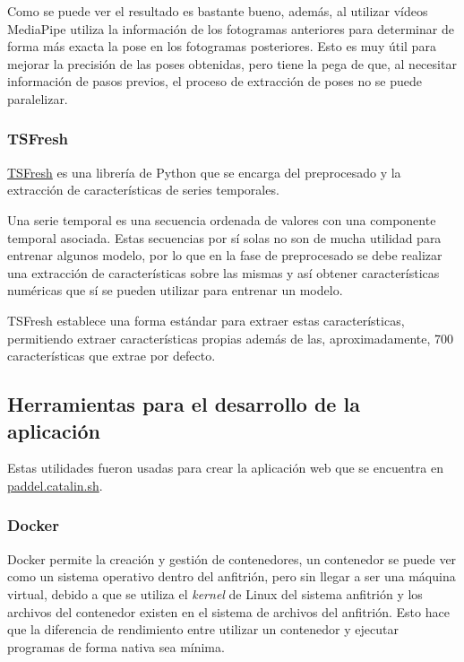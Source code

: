 Como se puede ver el resultado es bastante bueno, además, al utilizar vídeos
MediaPipe utiliza la información de los fotogramas anteriores para determinar de
forma más exacta la pose en los fotogramas posteriores. Esto es muy útil para
mejorar la precisión de las poses obtenidas, pero tiene la pega de que, al
necesitar información de pasos previos, el proceso de extracción de poses no se
puede paralelizar.

\subsubsection{TSFresh}

\href{https://github.com/blue-yonder/tsfresh}{TSFresh} \cite{christ2018time} es
una librería de Python que se encarga del preprocesado y la extracción de
características de series temporales.

Una serie temporal es una secuencia ordenada de valores con una componente
temporal asociada. Estas secuencias por sí solas no son de mucha utilidad para
entrenar algunos modelo, por lo que en la fase de preprocesado se debe realizar
una extracción de características sobre las mismas y así obtener características
numéricas que sí se pueden utilizar para entrenar un modelo.

TSFresh establece una forma estándar para extraer estas características,
permitiendo extraer características propias además de las, aproximadamente, 700
características que extrae por defecto.

\subsection{Herramientas para el desarrollo de la aplicación}

Estas utilidades fueron usadas para crear la aplicación web que se encuentra en
\href{https://paddel.catalin.sh}{paddel.catalin.sh}.

\subsubsection{Docker}

Docker permite la creación y gestión de contenedores, un contenedor se puede ver
como un sistema operativo dentro del anfitrión, pero sin llegar a ser una
máquina virtual, debido a que se utiliza el \textit{kernel} de Linux del sistema
anfitrión y los archivos del contenedor existen en el sistema de archivos del
anfitrión. Esto hace que la diferencia de rendimiento entre utilizar un
contenedor y ejecutar programas de forma nativa sea mínima.

